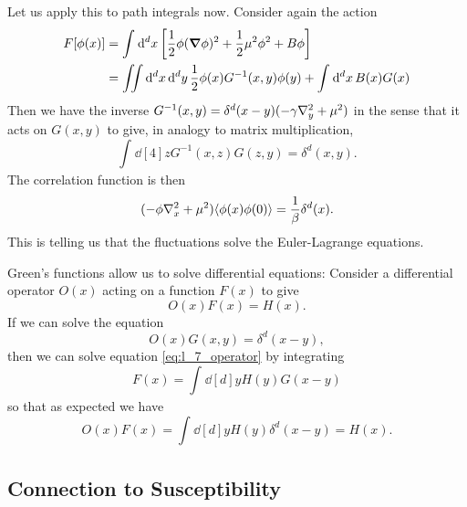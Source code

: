 Let us apply this to path integrals now. Consider again the action
\begin{align}
  F[\phi(x)] &= \int_{}^{} \dd[d]{x} \left[ \frac{1}{2} \phi(\grad\phi)^2 + \frac{1}{2} \mu^2\phi^2 + B \phi\right] \\
	     &= \iint \dd[d]{x} \dd[d]{y} \frac{1}{2} \phi(x) G^{-1} (x, y) \phi(y) + \int_{}^{} \dd[d]{x} B(x) G(x)
\end{align}
Then we have the inverse $G^{-1}(x, y) = \delta^d(x - y) (-\gamma\laplacian_{y} + \mu^2)$ in the sense that it acts on $G(x, y)$ to give, in analogy to matrix multiplication,
\begin{equation}
  \int_{}^{} \dd[4]{z} G^{-1}(x, z) G(z, y) = \delta^d(x, y).
\end{equation}
The correlation function is then
\begin{equation}
  (-\phi \laplacian_x + \mu^2) \langle \phi(x) \phi(0) \rangle = \frac{1}{\beta}\delta^d(x).
\end{equation}
This is telling us that the fluctuations solve the Euler-Lagrange equations.
\begin{leftbar}
  \begin{remark}
    Green's functions allow us to solve differential equations:
    Consider a differential operator $O(x)$ acting on a function $F(x)$ to give
    \begin{equation}
      \label{eq:l_7_operator}
      O(x) F(x) = H(x).
    \end{equation}
    If we can solve the equation
    \begin{equation}
      O(x) G(x, y) = \delta^d(x - y),
    \end{equation}
    then we can solve equation \eqref{eq:l_7_operator} by integrating
    \begin{equation}
      F(x) = \int_{}^{} \dd[d]{y} H(y) G(x - y)
    \end{equation}
    so that as expected we have
    \begin{equation}
      O(x) F(x) = \int_{}^{} \dd[d]{y} H(y) \delta^d(x - y) = H(x).
    \end{equation}
  \end{remark}
\end{leftbar}

\subsection{Connection to Susceptibility}%
\label{sub:connection_to_susceptibility}

